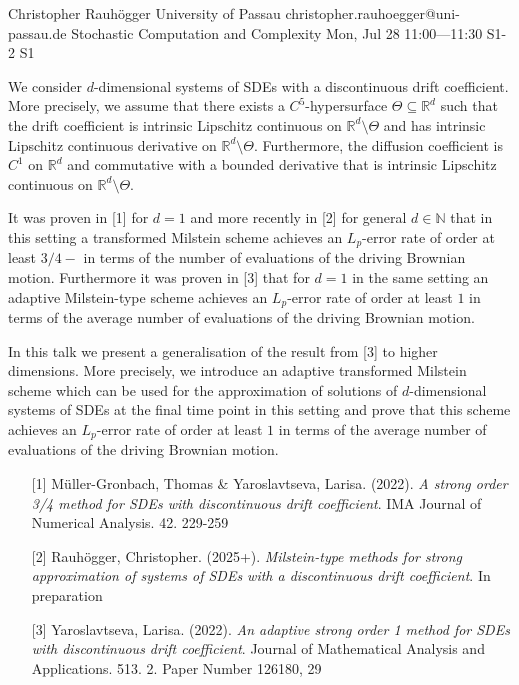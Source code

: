\begin{talk}
  {Christopher Rauh\"ogger}%
  {University of Passau}%
  {christopher.rauhoegger@uni-passau.de}%
  {Stochastic Computation and Complexity}%
  {}%
  {}%
  {Mon, Jul 28 11:00---11:30}%
  {S1-2}%
  {S1}%
    
   
We consider $d$-dimensional systems of SDEs with a discontinuous drift coefficient. More precisely,
we assume that there exists a $C^{5}$-hypersurface
$\Theta\subseteq \mathbb{R}^{d}$ such that the drift coefficient is intrinsic Lipschitz continuous on $\mathbb{R}^{d}\setminus \Theta$ and has intrinsic Lipschitz continuous derivative on $\mathbb{R}^{d}\setminus \Theta$.
Furthermore, the diffusion coefficient is $C^{1}$ on $\mathbb{R}^{d}$ and commutative with a bounded derivative that is intrinsic Lipschitz continuous on $\mathbb{R}^{d}\setminus \Theta$.

It was proven in [1] for $d = 1$ and more recently in [2] for general $d \in \mathbb{N}$ that in this setting a transformed Milstein scheme achieves an $L_{p}$-error rate of order at least $3/4-$ in terms of the number of evaluations of the
driving Brownian motion.
Furthermore it was proven in [3] that for $d = 1$ in the same setting an adaptive Milstein-type scheme achieves an $L_{p}$-error rate of order at least $1$ in terms of the average number of evaluations of the driving Brownian motion. 

In this talk we present a generalisation of the result from [3] to higher dimensions. More precisely, we introduce an adaptive transformed Milstein scheme which can be used for the approximation of solutions of $d$-dimensional systems of SDEs at the final time point in this setting and
prove that this scheme achieves an $L_{p}$-error rate of order at least $1$ in terms of the average number of evaluations of the
driving Brownian motion.

\medskip

\begin{enumerate}
 \item[{[1]}] M\"{u}ller-Gronbach, Thomas \& Yaroslavtseva, Larisa. (2022). {\it A strong order 3/4 method for {SDE}s with discontinuous drift
  coefficient}. IMA Journal of Numerical Analysis. 42. 229-259
 \item[{[2]}] Rauh\"ogger, Christopher. (2025+). {\it Milstein-type methods for strong approximation of systems of SDEs with a discontinuous drift coefficient}. In preparation
 \item[{[3]}] Yaroslavtseva, Larisa. (2022). {\it An adaptive strong order 1 method for {SDE}s with
  discontinuous drift coefficient}. Journal of Mathematical Analysis and Applications. 513. 2. Paper Number 126180, 29
\end{enumerate}

\end{talk}

